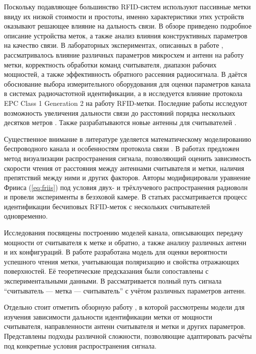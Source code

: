 \documentclass[12pt]{article}
\theoremstyle{definition}
\begin{document}
Поскольку подавляющее большинство RFID-систем используют пассивные метки ввиду их низкой стоимости и простоты, именно характеристики этих устройств оказывают решающее влияние на дальность связи. В обзоре \cite{MarrocMarroccoG} приведено подробное описание устройства меток, а также анализ влияния конструктивных параметров на качество связи. В лабораторных экспериментах, описанных в работе \cite{Mayer2007}, рассматривалось влияние различных параметров микросхем и антенн на работу метки, корректность обработки команд считывателя, диапазон рабочих мощностей, а также эффективность обратного рассеяния радиосигнала. В \cite{Nikitin2012} даётся обоснование выбора измерительного оборудования для оценки параметров канала в системах радиочастотной идентификации, а в \cite{Nikitin2009} исследуется влияние протокола EPC Class 1 Generation 2 на работу RFID-метки. Последние работы исследуют возможность увеличения дальности связи до расстояний порядка нескольких десятков метров \cite{Rocha2024, Bendavid2024}. Также разрабатываются новые антенны для считывателей \cite{Zheng2026}.

Существенное внимание в литературе уделяется математическому моделированию беспроводного канала и особенностям протокола связи \cite{ElAbsi2023, Padmal2024}. В работах \cite{Banerjee2007, Banerjee2008} предложен метод визуализации распространения сигнала, позволяющий оценить зависимость скорости чтения от расстояния между антеннами считывателя и метки, наличия препятствий между ними и других факторов. Авторы модифицировали уравнение Фрииса (\ref{eq:friis}) под условия двух- и трёхлучевого распространения радиоволн и провели эксперименты в безэховой камере. В статьях \cite{Bakri2025, ElHadidy2025} рассматривается процесс идентификации бесчиповых RFID-меток с нескольких считывателей одновременно.

Исследования \cite{Griffin2007, Griffin2009, Trotter2009, Hasan2011, Kaifas2024, Borgna2025, Yang2026, Long2025} посвящены построению моделей канала, описывающих передачу мощности от считывателя к метке и обратно, а также анализу различных антенн и их конфигураций. В работе \cite{Dimitriou2014} разработана модель для оценки вероятности успешного чтения метки, учитывающая поляризацию и свойства отражающих поверхностей. Её теоретические предсказания были сопоставлены с экспериментальными данными. В \cite{Nikitin2008} рассматривается полный путь сигнала “считыватель — метка — считыватель” с учётом различных параметров антенн.

Отдельно стоит отметить обзорную работу \cite{Marrocco}, в которой рассмотрены модели для изучения зависимости дальности идентификации метки от мощности считывателя, направленности антенн считывателя и метки и других параметров. Представлены подходы различной сложности, позволяющие адаптировать расчёты под конкретные условия распространения сигнала.
\end{document}
